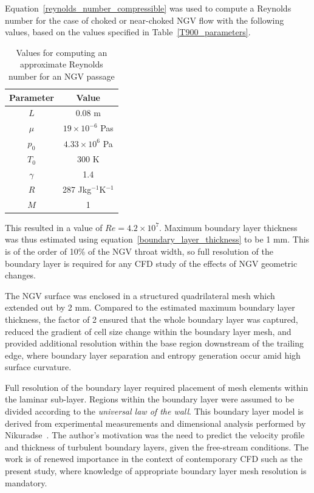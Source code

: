 \documentclass[a4paper, 11pt, oneside]{report}
\begin{document}
Equation~\ref{reynolds_number_compressible} was used to compute a Reynolds number for the case of choked or near-choked NGV flow with the following values, based on the values specified in Table~\ref{T900_parameters}.
\begin{table}[H]
\caption{Values for computing an approximate Reynolds number for an NGV passage}
\label{reynolds_number_parameters}
\begin{center}
\begin{tabular}{|c|c|}
\hline
Parameter & Value\\
\hline
$L$ & 0.08 m\\
$\mu$ & $19 \times 10^{-6}$ Pas\\
$p_0$ & $4.33 \times 10^6$ Pa\\
$T_0$ & 300 K\\
$\gamma$ & 1.4\\
$R$ & 287 Jkg$^{-1}$K$^{-1}$\\
$M$ & 1\\
\hline
\end{tabular}
\end{center}
\end{table}
This resulted in a value of $Re = 4.2 \times 10^7$. Maximum boundary layer thickness was thus estimated using equation~\ref{boundary_layer_thickness} to be 1 mm. This is of the order of 10\% of the NGV throat width, so full resolution of the boundary layer is required for any CFD study of the effects of NGV geometric changes.

The NGV surface was enclosed in a structured quadrilateral mesh which extended out by 2 mm. Compared to the estimated maximum boundary layer thickness, the factor of 2 ensured that the whole boundary layer was captured, reduced the gradient of cell size change within the boundary layer mesh, and provided additional resolution within the base region downstream of the trailing edge, where boundary layer separation and entropy generation occur amid high surface curvature.

Full resolution of the boundary layer required placement of mesh elements within the laminar sub-layer. Regions within the boundary layer were assumed to be divided according to the \textit{universal law of the wall}. This boundary layer model is derived from experimental measurements and dimensional analysis performed by Nikuradse~\cite{nikuradse_boundary_layers}. The author's motivation was the need to predict the velocity profile and thickness of turbulent boundary layers, given the free-stream conditions. The work is of renewed importance in the context of contemporary CFD such as the present study, where knowledge of appropriate boundary layer mesh resolution is mandatory. 
\end{document}

